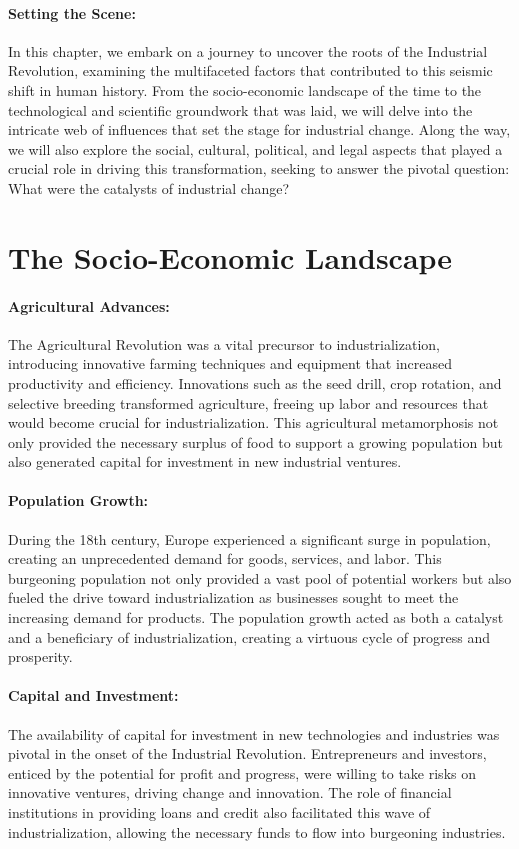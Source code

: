 \documentclass{book}
\begin{document}
\paragraph{Setting the Scene:}
In this chapter, we embark on a journey to uncover the roots of the Industrial Revolution, examining the multifaceted factors that contributed to this seismic shift in human history. From the socio-economic landscape of the time to the technological and scientific groundwork that was laid, we will delve into the intricate web of influences that set the stage for industrial change. Along the way, we will also explore the social, cultural, political, and legal aspects that played a crucial role in driving this transformation, seeking to answer the pivotal question: What were the catalysts of industrial change?

\section*{The Socio-Economic Landscape}

\paragraph{Agricultural Advances:}
The Agricultural Revolution was a vital precursor to industrialization, introducing innovative farming techniques and equipment that increased productivity and efficiency. Innovations such as the seed drill, crop rotation, and selective breeding transformed agriculture, freeing up labor and resources that would become crucial for industrialization. This agricultural metamorphosis not only provided the necessary surplus of food to support a growing population but also generated capital for investment in new industrial ventures.

\paragraph{Population Growth:}
During the 18th century, Europe experienced a significant surge in population, creating an unprecedented demand for goods, services, and labor. This burgeoning population not only provided a vast pool of potential workers but also fueled the drive toward industrialization as businesses sought to meet the increasing demand for products. The population growth acted as both a catalyst and a beneficiary of industrialization, creating a virtuous cycle of progress and prosperity.

\paragraph{Capital and Investment:}
The availability of capital for investment in new technologies and industries was pivotal in the onset of the Industrial Revolution. Entrepreneurs and investors, enticed by the potential for profit and progress, were willing to take risks on innovative ventures, driving change and innovation. The role of financial institutions in providing loans and credit also facilitated this wave of industrialization, allowing the necessary funds to flow into burgeoning industries.
\end{document}
